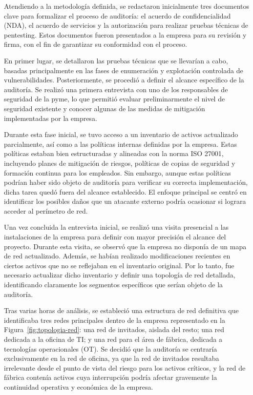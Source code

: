 \documentclass[a4paper, 11pt]{article}
\begin{document}
Atendiendo a la metodología definida, se redactaron inicialmente tres documentos clave para formalizar el proceso de auditoría: el acuerdo de confidencialidad (NDA), el acuerdo de servicios y la autorización para realizar pruebas técnicas de pentesting. Estos documentos fueron presentados a la empresa para su revisión y firma, con el fin de garantizar su conformidad con el proceso.


En primer lugar, se detallaron las pruebas técnicas que se llevarían a cabo, basadas principalmente en las fases de enumeración y explotación controlada de vulnerabilidades. Posteriormente, se procedió a definir el alcance específico de la auditoría. Se realizó una primera entrevista con uno de los responsables de seguridad de la pyme, lo que permitió evaluar preliminarmente el nivel de seguridad existente y conocer algunas de las medidas de mitigación implementadas por la empresa.


Durante esta fase inicial, se tuvo acceso a un inventario de activos actualizado parcialmente, así como a las políticas internas definidas por la empresa. Estas políticas estaban bien estructuradas y alineadas con la norma ISO 27001, incluyendo planes de mitigación de riesgos, políticas de copias de seguridad y formación continua para los empleados. Sin embargo, aunque estas políticas podrían haber sido objeto de auditoría para verificar su correcta implementación, dicha tarea quedó fuera del alcance establecido. El enfoque principal se centró en identificar los posibles daños que un atacante externo podría ocasionar si lograra acceder al perímetro de red.


Una vez concluida la entrevista inicial, se realizó una visita presencial a las instalaciones de la empresa para definir con mayor precisión el alcance del proyecto. 
Durante esta visita, se observó que la empresa no disponía de un mapa de red actualizado. Además, se habían realizado modificaciones recientes en 
ciertos activos que no se reflejaban en el inventario original. 
Por lo tanto, fue necesario actualizar dicho inventario y definir una topología de red detallada, identificando claramente los segmentos específicos que 
serían objeto de la auditoría.


Tras varias horas de análisis, se estableció una estructura de red definitiva que identificaba tres redes principales dentro de la empresa representado en la Figura~\ref{fig:topologia-red}: una red de invitados, aislada del resto; una red dedicada a la oficina de TI; y una red para el área de fábrica, dedicada a tecnologías operacionales (OT). Se decidió que la auditoría se centraría exclusivamente en la red de oficina, ya que la red de invitados resultaba irrelevante desde el punto de vista del riesgo para los activos críticos, y la red de fábrica contenía activos cuya interrupción podría afectar gravemente la continuidad operativa y económica de la empresa.
\end{document}
